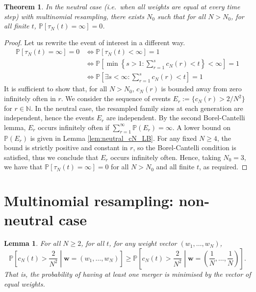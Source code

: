 \documentclass{article}
\newtheorem{thm}{Theorem}
\newtheorem{lemma}{Lemma}
\newcommand{\PR}{\mathbb{P}}
\begin{document}
\begin{thm}
In the neutral case (i.e.\ when all weights are equal at every time step) with multinomial resampling, there exists $N_0$ such that for all $N>N_0$, for all finite $t$, $\PR[\tau_N(t) = \infty] =0$.
\end{thm}

\begin{proof}
Let us rewrite the event of interest in a different way.
\begin{align*}
\PR[\tau_N(t) = \infty] =0 &\Leftrightarrow \PR[\tau_N(t) < \infty] =1 \\
&\Leftrightarrow \PR\left[ \min \left\{s>1 : \sum_{r=1}^s c_N(r) <t \right\} < \infty \right] =1 \\
&\Leftrightarrow \PR\left[ \exists s<\infty : \sum_{r=1}^s c_N(r) <t \right] =1
\end{align*}
It is sufficient to show that, for all $N>N_0$, $c_N(r)$ is bounded away from zero infinitely often in $r$.
We consider the sequence of events 
$E_r := \{ c_N(r) > 2/N^2 \}$ for $r \in \mathbb{N}$.
In the neutral case, the resampled family sizes at each generation are independent, hence the events $E_r$ are independent. 
By the second Borel-Cantelli lemma, $E_r$ occurs infinitely often if $\sum_{r=1}^\infty \PR(E_r) = \infty$. 
A lower bound on $\PR(E_r)$ is given in Lemma \ref{lem:neutral_cN_LB}. 
For any fixed $N\geq 4$, the bound is strictly positive and constant in $r$, so the Borel-Cantelli condition is satisfied, thus we conclude that $E_r$ occurs infinitely often.
Hence, taking $N_0=3$, we have that $\PR[\tau_N(t) = \infty] =0$ for all $N>N_0$ and all finite $t$, as required.
\end{proof}

\section*{Multinomial resampling: non-neutral case}

\begin{lemma}
For all $N\geq 2$, for all $t$, for any weight vector $(w_1, \dots, w_N)$,
\begin{equation*}
\PR \left[c_N(t) > \frac{2}{N^2} \middle| \mathbf{w}=(w_1, \dots, w_N) \right]
\geq \PR \left[c_N(t) > \frac{2}{N^2} \middle| \mathbf{w}=\left( \frac{1}{N}, \dots, \frac{1}{N} \right) \right] .
\end{equation*}
That is, the probability of having at least one merger is minimised by the vector of equal weights.
\end{lemma}
\end{document}
